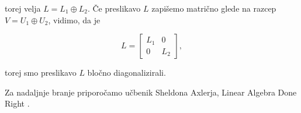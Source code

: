 \documentclass[a4paper,12pt]{article}
\begin{document}

torej velja $L = L_1 \oplus L_2$.
Če preslikavo $L$ zapišemo matrično glede na razcep $V = U_1 \oplus U_2$, vidimo, da je

\[
L= 
\begin{bmatrix}
    L_1 & 0 \\
    0 & L_2
\end{bmatrix},
\]


torej smo preslikavo $L$ bločno diagonalizirali.

Za nadaljnje branje priporočamo učbenik Sheldona Axlerja, Linear Algebra Done Right \cite{axler}.



\end{document}
